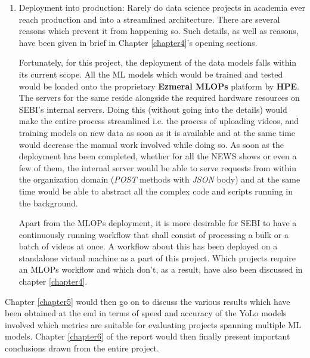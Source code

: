 \begin{enumerate}
  \item Deployment into production: Rarely do data science projects
    in academia ever reach production and into a streamlined
    architecture. There are several reasons which prevent it from
    happening so. Such details, as well as reasons, have been given
    in brief in Chapter \ref{chapter4}’s opening sections. \par
    Fortunately, for this project, the deployment of the data models
    falls within its current scope. All the ML models which would be
    trained and tested would be loaded onto the proprietary
    \textbf{Ezmeral MLOPs} platform by \textbf{HPE}. The servers for
    the same reside alongside the required hardware resources on
    SEBI’s internal servers. Doing this (without going into the
    details) would make the entire process streamlined i.e. the
    process of uploading videos, and training models on new data as
    soon as it is available and at the same time would decrease the
    manual work involved while doing so. As soon as the deployment
    has been completed, whether for all the NEWS shows or even a few
    of them, the internal server would be able to serve requests from
    within the organization domain (\textit{POST} methods with
    \textit{JSON} body) and at the same time would be able to
    abstract all the complex code and scripts running in the background. \par

    Apart from the MLOPs deployment, it is more desirable for SEBI to
    have a continuously running workflow that shall consist of
    processing a bulk or a batch of videos at once. A workflow about
    this has been deployed on a standalone virtual machine as a part
    of this project. Which projects require an MLOPs workflow and
    which don’t, as a result, have also been discussed in chapter
    \ref{chapter4}.
\end{enumerate}

Chapter \ref{chapter5} would then go on to discuss the various
results which have been obtained at the end in terms of speed and
accuracy of the YoLo models involved which metrics are suitable for
evaluating projects spanning multiple ML models. Chapter
\ref{chapter6} of the report would then finally present important
conclusions drawn from the entire project.
